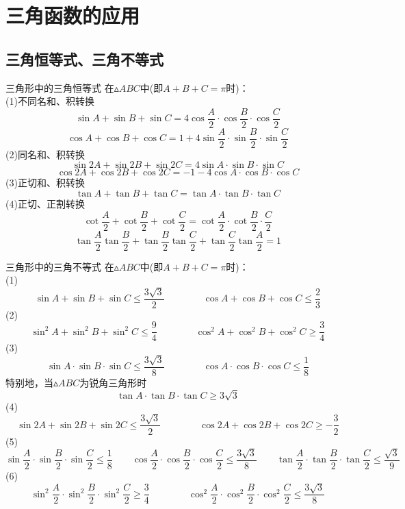 \documentclass[lang=cn, zihao=5]{elegantbook}
\begin{document}
\section{三角函数的应用}

\subsection{三角恒等式、三角不等式}

\begin{proposition}{三角形中的三角恒等式} %
    在$\vartriangle ABC$中(即$A+B+C=\pi$时)：\\
    (1)不同名和、积转换
    $$\sin A + \sin B + \sin C = 4 \cos \frac{A}{2} \cdot \cos \frac{B}{2} \cdot \cos \frac{C}{2}$$
    $$\cos A + \cos B + \cos C = 1 + 4 \sin \frac{A}{2} \cdot \sin \frac{B}{2} \cdot \sin \frac{C}{2}$$
    (2)同名和、积转换
    $$\sin 2A + \sin 2B + \sin 2C = 4\sin A \cdot \sin B \cdot \sin C$$
    $$\cos 2A + \cos 2B + \cos 2C = -1 - 4\cos A \cdot \cos B \cdot \cos C$$
    (3)正切和、积转换
    $$\tan A + \tan B + \tan C = \tan A \cdot \tan B \cdot \tan C$$
    (4)正切、正割转换
    $$\cot \frac{A}{2} + \cot \frac{B}{2} + \cot \frac{C}{2} = \cot \frac{A}{2} \cdot \cot \frac{B}{2} \cdot \frac{C}{2}$$
    $$\tan \frac{A}{2} \tan \frac{B}{2} + \tan \frac{B}{2} \tan \frac{C}{2} + \tan \frac{C}{2} \tan \frac{A}{2} = 1$$
\end{proposition}

\begin{proposition}{三角形中的三角不等式} %
    在$\vartriangle ABC$中(即$A+B+C=\pi$时)：\\
    (1)$$\sin A + \sin B + \sin C \leq \frac{ 3\sqrt{3} }{2} \qquad \qquad \cos A + \cos B + \cos C \leq \frac{2}{3}$$
    (2)$$\sin ^2 A + \sin ^2 B + \sin ^2 C \leq \frac{9}{4} \qquad \qquad \cos ^2 A + \cos ^2 B + \cos ^2 C \geq \frac{3}{4}$$
    (3)$$\sin A \cdot \sin B \cdot \sin C \leq \frac{ 3\sqrt{3} }{8} \qquad \qquad \cos A \cdot \cos B \cdot \cos C \leq \frac{1}{8}$$
    特别地，当$\vartriangle ABC$为锐角三角形时
    $$\tan A \cdot \tan B \cdot \tan C \geq 3\sqrt{3}$$
    (4)
    $$\sin 2A + \sin 2B + \sin 2C \leq \frac{ 3\sqrt{3} }{2} \qquad \qquad \cos 2A + \cos 2B + \cos 2C \geq -\frac{3}{2}$$
    (5)
    $$\sin \frac{A}{2} \cdot \sin \frac{B}{2} \cdot \sin \frac{C}{2} \leq \frac{1}{8} \qquad \cos \frac{A}{2} \cdot \cos \frac{B}{2} \cdot \cos \frac{C}{2} \leq \frac{3 \sqrt{3}}{8} \qquad \tan \frac{A}{2} \cdot \tan \frac{B}{2} \cdot \tan \frac{C}{2} \leq \frac{\sqrt{3}}{9}$$
    (6)$$\sin ^2 \frac{A}{2} \cdot \sin ^2 \frac{B}{2} \cdot \sin ^2 \frac{C}{2} \geq \frac{3}{4} \qquad \qquad \cos ^2 \frac{A}{2} \cdot \cos ^2 \frac{B}{2} \cdot \cos ^2 \frac{C}{2} \leq \frac{3 \sqrt{3}}{8}$$
\end{proposition}
\end{document}

